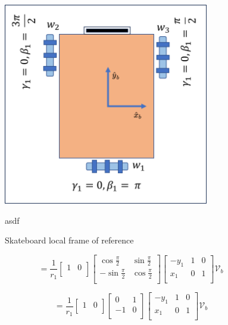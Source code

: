 \documentclass[12pt, twoside]{report}
\begin{document}
\begin{figure}[hbt!]
    \centering
    \includegraphics[width=0.8\textwidth]{m_kinematic_shematic.png}
    \caption{Skateboard local frame of reference}
    {asdf}
    \label{fig:kinematic_shematic}
\end{figure}


\begin{equation}
    = \frac{1}{r_1}
    \begin{bmatrix}
        1 & 0 \\
    \end{bmatrix}
    \begin{bmatrix}
        \cos \frac{\pi}{2}  & \sin \frac{\pi}{2} \\
        -\sin \frac{\pi}{2} & \cos \frac{\pi}{2} \\
    \end{bmatrix}
    \begin{bmatrix}
        -y_1 & 1 & 0 \\
        x_1  & 0 & 1 \\
    \end{bmatrix}
    \mathcal{V}_b
\end{equation}


\begin{equation}
    = \frac{1}{r_1} \left[\begin{array}{cc}
            1 & 0 \\
        \end{array}\right]
    \begin{bmatrix}
        0  & 1 \\
        -1 & 0 \\
    \end{bmatrix}
    \begin{bmatrix}
        -y_1 & 1 & 0 \\
        x_1  & 0 & 1 \\
    \end{bmatrix}
    \mathcal{V}_b
\end{equation}
\end{document}
